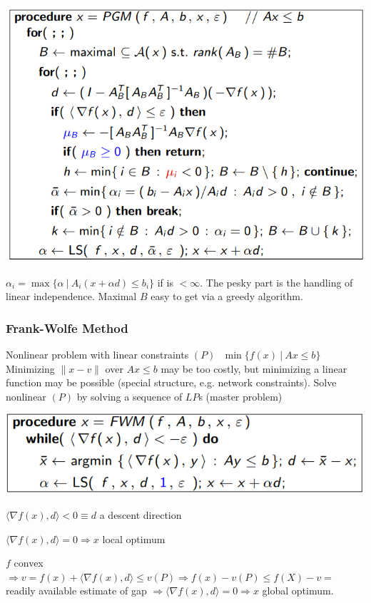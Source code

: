 \documentclass[10pt]{report}
\begin{document}
\begin{center}
	\includegraphics[scale=0.75]{12.png}
\end{center}
$\alpha_i = \max\{\alpha\:|\:A_i(x+\alpha d)\leq b_i\}$ if is $< \infty$. The pesky part is the handling of linear independence. Maximal $B$ easy to get via a greedy algorithm.
\subsubsection{Frank-Wolfe Method}
Nonlinear problem with linear constraints $(P)\:\:\:\min\{f(x)\:|\:Ax\leq b\}$\\
Minimizing $\| x-v\|$ over $Ax\leq b$ may be too costly, but minimizing a linear function may be possible (special structure, e.g. network constraints). Solve nonlinear $(P)$ by solving a sequence of $LP$s (master problem)
\begin{center}
	\includegraphics[scale=0.75]{13.png}
\end{center}
\begin{list}{}{}
	\item $\langle \nabla f(x),d\rangle<0 \equiv d$ a descent direction
	\item $\langle \nabla f(x),d\rangle = 0 \Rightarrow x$ local optimum
\end{list}
$f$ convex $\Rightarrow v = f(x) + \langle \nabla f(x),d\rangle\leq v(P) \Rightarrow f(x) - v(P)\leq f(X) - v =$ readily available estimate of gap $\Rightarrow \langle \nabla f(x),d\rangle = 0 \Rightarrow x$ global optimum.
\end{document}
